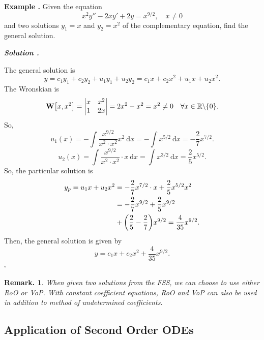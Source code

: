 \documentclass[12pt, a4paper]{article}
\newcounter{index}[subsection]
\newenvironment*{eg}{\begin{framed}\par\noindent\textbf{Example \thesubsection.\stepcounter{index}\theindex}}{\par\end{framed}}
\newcounter{nprf}[subsection]
\newenvironment*{sol}{\par\indent\textbf{\textit{Solution \stepcounter{nprf}\thenprf.}}\par}{\hfill{$\square$}\par}
\newtheorem*{rmk}{Remark.}
\def\R{{\mathbb{R}}}
\def\d{{\mathrm{d}}}
\def\W{\vb W}
\begin{document}
\begin{eg}
	Given the equation \[x^2y''-2xy'+2y=x^{9/2},\quad x\neq0\] and two solutions $y_1=x$ and $y_2=x^2$ of the complementary equation, find the general solution. 
	\begin{sol}
		The general solution is \[y=c_1y_1+c_2y_2+u_1y_1+u_2y_2=c_1x+c_2x^2+u_1x+u_2x^2.\] The Wronskian is \[\W\qty[x,x^2]=\mqty|x&x^2\\1&2x|=2x^2-x^2=x^2\neq0\quad\forall x\in\R\backslash\qty{0}.\] So, \[u_1(x)=-\int\dfrac{x^{9/2}}{x^2\cdot x^2}x^2\ \d{x}=-\int x^{5/2}\ \d{x}=-\dfrac{2}{7}x^{7/2}.\] \[u_2(x)=\int\dfrac{x^{9/2}}{x^2\cdot x^2}\cdot x\ \d{x}=\int x^{3/2}\ \d{x}=\dfrac{2}{5}x^{5/2}.\] So, the particular solution is \begin{align*}y_p=u_1x+u_2x^2&=-\dfrac{2}{7}x^{7/2}\cdot x+\dfrac{2}{5}x^{5/2}x^2\\&=-\dfrac{2}{7}x^{9/2}+\dfrac{2}{5}x^{9/2}\\&+\qty(\dfrac{2}{5}-\dfrac{2}{7})x^{9/2}=\dfrac{4}{35}x^{9/2}.\end{align*} Then, the general solution is given by \[y=c_1x+c_2x^2+\dfrac{4}{35}x^{9/2}.\]
	\end{sol}
\end{eg}
\begin{rmk}
	When given two solutions from the FSS, we can choose to use either RoO or VoP. With constant coefficient equations, RoO and VoP can also be used in addition to method of undetermined coefficients. 
\end{rmk}

\subsection{Application of Second Order ODEs}
\end{document}
